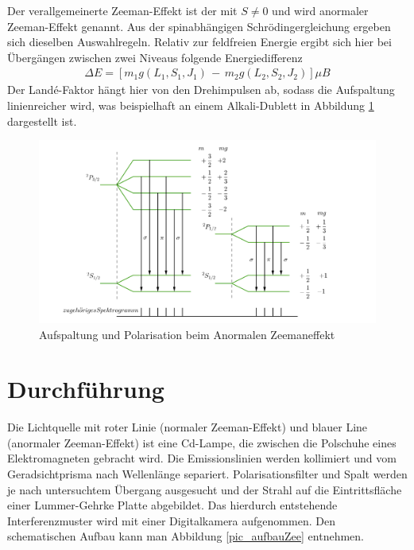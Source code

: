 Der verallgemeinerte Zeeman-Effekt ist der mit $S\neq0$ und wird anormaler Zeeman-Effekt genannt. Aus der spinabhängigen Schrödingergleichung ergeben
sich dieselben Auswahlregeln. Relativ zur feldfreien Energie ergibt sich hier bei Übergängen zwischen zwei Niveaus folgende Energiedifferenz
\begin{align}
 \Delta E = [m_1 g(L_1,S_1,J_1)\, - \,m_2g(L_2,S_2,J_2)]\mu B
\end{align}
Der Landé-Faktor hängt hier von den Drehimpulsen ab, sodass die Aufspaltung linienreicher wird, was beispielhaft an einem Alkali-Dublett in Abbildung
\ref{pic_anorZee} dargestellt ist.
\begin{figure}[H]
\includegraphics[width=1\textwidth]{../pics/anorZee.png}
\caption{Aufspaltung und Polarisation beim Anormalen Zeemaneffekt}
\label{pic_anorZee}
\end{figure}

\section{Durchführung}
Die Lichtquelle mit roter Linie (normaler Zeeman-Effekt) und blauer Line (anormaler Zeeman-Effekt) ist eine Cd-Lampe, die zwischen die Polschuhe eines
Elektromagneten gebracht wird. Die Emissionslinien werden kollimiert und vom Geradsichtprisma nach Wellenlänge separiert. Polarisationsfilter und
Spalt werden je nach untersuchtem Übergang ausgesucht und der Strahl auf die Eintrittsfläche einer Lummer-Gehrke Platte abgebildet. Das hierdurch
entstehende Interferenzmuster wird mit einer Digitalkamera aufgenommen. Den schematischen Aufbau kann man Abbildung \ref{pic_aufbauZee} entnehmen.

